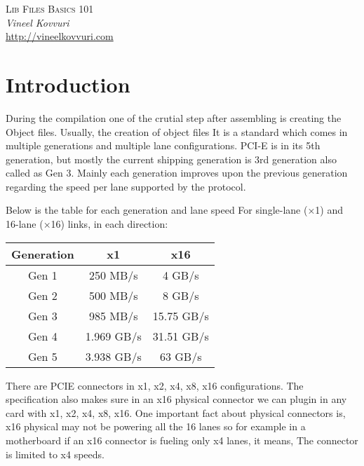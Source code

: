 \documentclass{article}
\begin{document}
\begin{titlepage}
   \begin{center}
      \Large\textsc{Lib Files Basics 101}\\
      \vspace{5mm}
      \Large\textit{Vineel Kovvuri}\\
      \url{http://vineelkovvuri.com}\\
   \end{center}
\end{titlepage}

\tableofcontents

\newpage
\section{Introduction}
During the compilation one of the crutial step after assembling is 
creating the Object files. Usually, the creation of object files
It is a standard which comes in multiple generations
and multiple lane configurations. PCI-E is in its 5th generation,
but mostly the current shipping generation is 3rd generation also
called as Gen 3. Mainly each generation improves upon the previous
generation regarding the speed per lane supported by the protocol.

Below is the table for each generation and lane speed 
For single-lane (×1) and 16-lane (×16) links, in each direction:
\begin{center}
\begin{tabular}{|c|c|c|}
 Generation &x1         &x16          \\
 \hline
 Gen 1      &250 MB/s   &4 GB/s       \\
 Gen 2      &500 MB/s   &8 GB/s       \\
 Gen 3      &985 MB/s   &15.75 GB/s   \\
 Gen 4      &1.969 GB/s &31.51 GB/s   \\
 Gen 5      &3.938 GB/s &63 GB/s
\end{tabular}
\end{center}

There are PCIE connectors in x1, x2, x4, x8, x16 configurations.
The specification also makes sure in an x16 physical connector
we can plugin in any card with x1, x2, x4, x8, x16. One important fact
about physical connectors is, x16 physical may not be powering
all the 16 lanes so for example in a motherboard if an x16 connector
is fueling only x4 lanes, it means, The connector is limited to x4 speeds.
\end{document}
